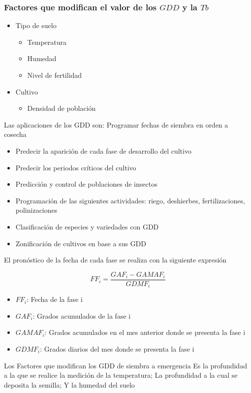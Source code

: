 \subsubsection{Factores que modifican el valor de los $GDD$ y la $Tb$}
\begin{itemize}
    \item Tipo de suelo \begin{itemize}
        \item Temperatura
        \item Humedad
        \item Nivel de fertilidad
    \end{itemize}
    \item Cultivo\begin{itemize}
        \item Densidad de población
    \end{itemize}
\end{itemize}

Las aplicaciones de los GDD son: 
Programar fechas de siembra en orden a cosecha
\begin{itemize}
    \item Predecir la aparición de cada fase de desarrollo del cultivo
    \item Predecir los periodos críticos del cultivo
    \item Predicción y control de poblaciones de insectos
    \item Programación de las siguientes actividades: riego, deshierbes, fertilizaciones, polinizaciones
    \item Clasificación de especies y variedades con GDD
    \item Zonificación de cultivos en base a sus GDD
\end{itemize}

El pronóstico de la fecha de cada fase se realiza con la siguiente expresión

\begin{equation}
    FF_i=\frac{GAF_i -GAMAF_i}{GDMF_i}
\end{equation}

\begin{notation}
    \begin{itemize}
        \item $FF_i$: Fecha de la fase i
        \item $GAF_i$: Grados acumulados de la fase i
        \item $GAMAF_i$: Grados acumulados en el mes anterior donde se presenta la fase i
        \item $GDMF_i$: Grados diarios del mes donde se presenta la fase i
    \end{itemize}
\end{notation}
Los Factores que modifican los GDD de siembra a emergencia Es la profundidad a la que se realice la medición de la temperatura; La profundidad a la cual se deposita la semilla; Y la humedad del suelo

